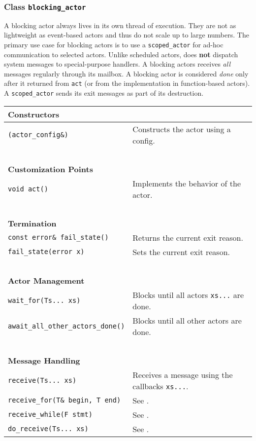 \clearpage
\subsubsection{Class \lstinline^blocking_actor^}

A blocking actor always lives in its own thread of execution. They are not as
lightweight as event-based actors and thus do not scale up to large numbers.
The primary use case for blocking actors is to use a \lstinline^scoped_actor^
for ad-hoc communication to selected actors. Unlike scheduled actors, \lib does
\textbf{not} dispatch system messages to special-purpose handlers. A blocking
actors receives \emph{all} messages regularly through its mailbox. A blocking
actor is considered \emph{done} only after it returned from \lstinline^act^ (or
from the implementation in function-based actors). A \lstinline^scoped_actor^
sends its exit messages as part of its destruction.

\begin{center}
\begin{tabular}{ll}
  \textbf{Constructors} & ~ \\
  \hline
  \lstinline^(actor_config&)^ & Constructs the actor using a config. \\
  \hline
  ~ & ~ \\ \textbf{Customization Points} & ~ \\
  \hline
  \lstinline^void act()^ & Implements the behavior of the actor. \\
  \hline
  ~ & ~ \\ \textbf{Termination} & ~ \\
  \hline
  \lstinline^const error& fail_state()^ & Returns the current exit reason. \\
  \hline
  \lstinline^fail_state(error x)^ & Sets the current exit reason. \\
  \hline
  ~ & ~ \\ \textbf{Actor Management} & ~ \\
  \hline
  \lstinline^wait_for(Ts... xs)^ & Blocks until all actors \lstinline^xs...^ are done. \\
  \hline
  \lstinline^await_all_other_actors_done()^ & Blocks until all other actors are done. \\
  \hline
  ~ & ~ \\ \textbf{Message Handling} & ~ \\
  \hline
  \lstinline^receive(Ts... xs)^ & Receives a message using the callbacks \lstinline^xs...^. \\
  \hline
  \lstinline^receive_for(T& begin, T end)^ & See . \\
  \hline
  \lstinline^receive_while(F stmt)^ & See . \\
  \hline
  \lstinline^do_receive(Ts... xs)^ & See . \\
  \hline
\end{tabular}
\end{center}

